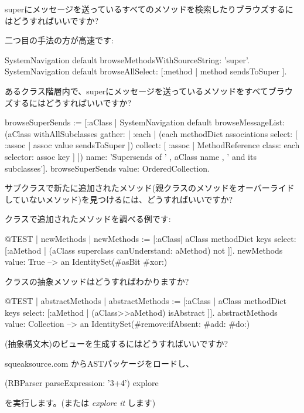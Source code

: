 \documentclass[a4paper,10pt,twoside]{book}
\begin{document}
\begin{faq}
superにメッセージを送っているすべてのメソッドを検索したりブラウズするにはどうすればいいですか?
\end{faq}
\answer
二つ目の手法の方が高速です:
\begin{code}{}
SystemNavigation default browseMethodsWithSourceString: 'super'.
SystemNavigation default browseAllSelect: [:method | method sendsToSuper ].
\end{code}

\begin{faq}
あるクラス階層内で、superにメッセージを送っているメソッドをすべてブラウズするにはどうすればいいですか?
\end{faq}
\answer
\begin{code}{}
browseSuperSends := [:aClass | SystemNavigation default
	browseMessageList: (aClass withAllSubclasses gather: [ :each |
		(each methodDict associations
			select: [ :assoc | assoc value sendsToSuper ])
				collect: [ :assoc | MethodReference class: each selector: assoc key ] ])
	name: 'Supersends of ' , aClass name , ' and its subclasses'].
browseSuperSends value: OrderedCollection.
\end{code}

\begin{faq}
サブクラスで新たに追加されたメソッド(親クラスのメソッドをオーバーライドしていないメソッド)を見つけるには、どうすればいいですか?
\end{faq}
\answer
{}クラスで追加されたメソッドを調べる例です:
\begin{code}{@TEST | newMethods |}
newMethods := [:aClass| aClass methodDict keys select:
	[:aMethod | (aClass superclass canUnderstand: aMethod) not ]].
newMethods value: True --> an IdentitySet(#asBit #xor:)
\end{code}

\begin{faq}
クラスの抽象メソッドはどうすればわかりますか?
\end{faq}
\answer
\begin{code}{@TEST | abstractMethods |}
abstractMethods :=
	[:aClass | aClass methodDict keys select:
		[:aMethod | (aClass>>aMethod) isAbstract ]].
abstractMethods value: Collection --> an IdentitySet(#remove:ifAbsent: #add: #do:)
\end{code}

\begin{faq}
(抽象構文木)のビューを生成するにはどうすればいいですか?
\end{faq}
\answer
squeaksource.com からASTパッケージをロードし、
\begin{code}{}
(RBParser parseExpression: '3+4') explore
\end{code}
を実行します。(または \emph{explore it} します)
\end{document}
